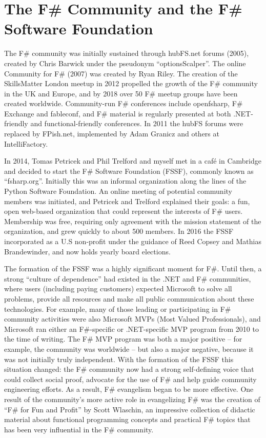 \documentclass[acmsmall,review]{acmart}\settopmatter{printfolios=true,printccs=false,printacmref=false}
\begin{document}
\section*{The F\# Community and the F\# Software Foundation }

The F\# community was initially sustained through hubFS.net forums (2005), created by Chris Barwick under the pseudonym “optionsScalper”. The online Community for F\# (2007) was created by Ryan Riley.  The creation of the SkillsMatter London meetup in 2012 propelled the growth of the F\# community in the UK and Europe, and by 2018 over 50 F\# meetup groups have been created worldwide.  Community-run F\# conferences include openfsharp, F\# Exchange and fableconf, and F\# material is regularly presented at both .NET-friendly and functional-friendly conferences. In 2011 the hubFS forums were replaced by FPish.net, implemented by Adam Granicz and others at IntelliFactory. 

In 2014, Tomas Petricek and Phil Trelford and myself met in a café in Cambridge and decided to start the F\# Software Foundation (FSSF), commonly known as “fsharp.org”.  Initially this was an informal organization along the lines of the Python Software Foundation.  An online meeting of potential community members was initiated, and Petricek and Trelford explained their goals: a fun, open web-based organization that could represent the interests of F\# users.  Membership was free, requiring only agreement with the mission statement of the organization, and grew quickly to about 500 members.  In 2016 the FSSF incorporated as a U.S non-profit under the guidance of Reed Copsey and Mathias Brandewinder, and now holds yearly board elections. 

The formation of the FSSF was a highly significant moment for F\#.  Until then, a strong “culture of dependence” had existed in the .NET and F\# communities, where users (including paying customers) expected Microsoft to solve all problems, provide all resources and make all public communication about these technologies.  For example, many of those leading or participating in F\# community activities were also Microsoft MVPs (Most Valued Professionals), and Microsoft ran either an F\#-specific or .NET-specific MVP program from 2010 to the time of writing.  The F\# MVP program was both a major positive – for example, the community was worldwide – but also a major negative, because it was not initially truly independent. With the formation of the FSSF this situation changed: the F\# community now had a strong self-defining voice that could collect social proof, advocate for the use of F\# and help guide community engineering efforts. As a result, F\# evangelism began to be more effective. One result of the community’s more active role in evangelizing F\# was the creation of “F\# for Fun and Profit” by Scott Wlaschin, an impressive collection of didactic material about functional programming concepts and practical F\# topics that has been very influential in the F\# community.
\end{document}
